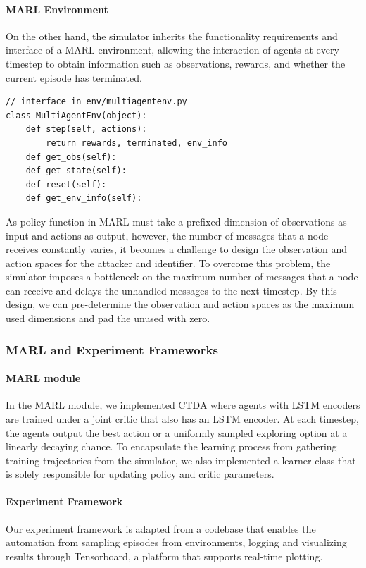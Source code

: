 \documentclass[a4paper,11pt]{article}
\begin{document}
\paragraph{MARL Environment}
On the other hand, the simulator inherits the functionality requirements and interface of a MARL environment, allowing the interaction of agents at every timestep to obtain information such as observations, rewards, and whether the current episode has terminated.
\begin{lstlisting}
// interface in env/multiagentenv.py
class MultiAgentEnv(object):
    def step(self, actions): 
        return rewards, terminated, env_info
    def get_obs(self):   
    def get_state(self):  
    def reset(self):
    def get_env_info(self):
\end{lstlisting}
As policy function in MARL must take a prefixed dimension of observations as input and actions as output, however, the number of messages that a node receives constantly varies, it becomes a challenge to design the observation and action spaces for the attacker and identifier. To overcome this problem, the simulator imposes a bottleneck on the maximum number of messages that a node can receive and delays the unhandled messages to the next timestep. By this design, we can pre-determine the observation and action spaces as the maximum used dimensions and pad the unused with zero.   
\subsubsection{MARL and Experiment Frameworks}
\paragraph{MARL module} In the MARL module, we implemented CTDA where agents with LSTM encoders are trained under a joint critic that also has an LSTM encoder. At each timestep, the agents output the best action or a uniformly sampled exploring option at a linearly decaying chance. To encapsulate the learning process from gathering training trajectories from the simulator, we also implemented a learner class that is solely responsible for updating policy and critic parameters.
\paragraph{Experiment Framework}
Our experiment framework is adapted from a codebase \cite{TongHanWang} that enables the automation from sampling episodes from environments, logging and visualizing results through Tensorboard, a platform that supports real-time plotting.
\end{document}

